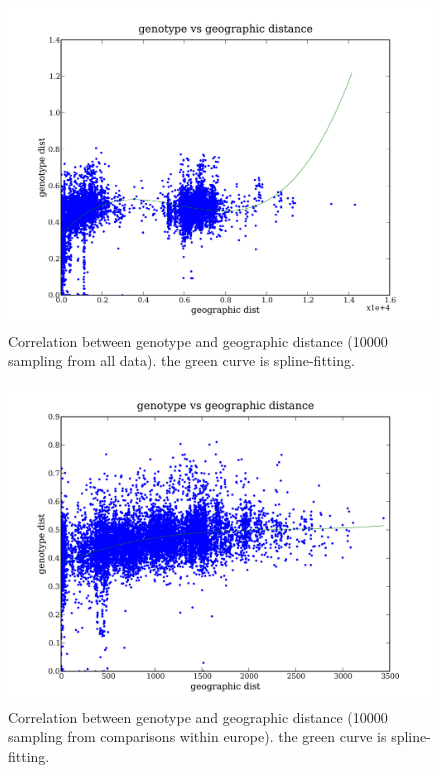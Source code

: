 \documentclass[a4paper,10pt]{article}
\begin{document}
\begin{figure}
\includegraphics[width=1\textwidth]{figures/data_d110_c0_5_geno_vs_geo_dist.png}
\caption{Correlation between genotype and geographic distance (10000 sampling from all data). the green curve is spline-fitting.}\label{fggd_2}
\end{figure}


\begin{figure}
\includegraphics[width=1\textwidth]{figures/data_d110_c0_5_geno_vs_geo_dist_eur.png}
\caption{Correlation between genotype and geographic distance (10000 sampling from comparisons within europe). the green curve is spline-fitting.}\label{fggd_3}
\end{figure}
\end{document}
